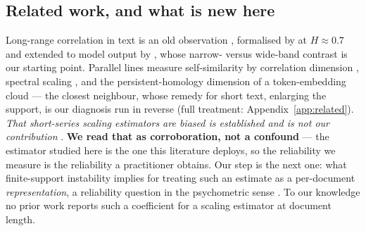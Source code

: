 \documentclass{article}
\newcommand{\Htrue}{\ensuremath{H}}
\begin{document}
\subsection{Related work, and what is new here}
\label{sec:related_main}
Long-range correlation in text is an old observation
\citep{ebeling1993entropy,altmann2012origin}, formalised by
\citet{alabdulmohsin2024fractal} at $\Htrue\!\approx\!0.7$ and extended to model
output by \citet{alabdulmohsin2025tale}, whose narrow- versus wide-band contrast is
our starting point. Parallel lines measure self-similarity by correlation dimension
\citep{du2025correlation}, spectral scaling \citep{yang2026turbulence}, and the
persistent-homology dimension of a token-embedding cloud
\citep{tulchinskii2023intrinsic,wei2025shortphd} --- the closest neighbour,
whose remedy for short text, enlarging the support, is our diagnosis run in
reverse (full treatment: Appendix~\ref{app:related}). \emph{That short-series
scaling estimators are biased is established and is not our contribution}
\citep{cannon1997scaled,millan2021preliminaries,grech2013multifractal,weron2002estimating}.
\textbf{We read that as corroboration, not a confound} --- the estimator
studied here is the one this literature deploys, so the reliability we
measure is the reliability a practitioner obtains. Our step is the next one:
what finite-support instability implies for treating such an estimate as a
per-document \emph{representation}, a reliability question in the
psychometric sense \citep{pronk2022methods,ellis2023spearmanbrown}. To our
knowledge no prior work reports such a coefficient for a scaling estimator at
document length.
\end{document}
